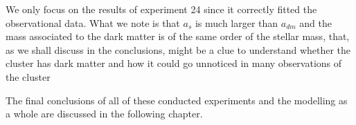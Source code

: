 We only focus on the results of experiment 24 since it correctly fitted the observational data. What we note is that $a_{s}$ is much larger than $a_{dm}$ and the mass associated to the dark matter is of the same order of the stellar mass, that, as we shall discuss in the conclusions, might be a clue to understand whether the cluster has dark matter and how it could go unnoticed in many observations of the cluster

The final conclusions of all of these conducted experiments and the modelling as a whole are discussed in the following chapter.
